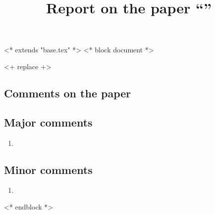 <* extends "base.tex" *>
<* block document *>
\pagestyle{fancy}
\rhead{\today}
\cfoot{\thepage}


\title{Report on the paper ``\papername''}
\author{\journalname}
\maketitle
<+ replace +>
\subsection*{Comments on the paper}
\subsection*{Major comments}
\begin{enumerate}
    \item <+ replace +>
\end{enumerate}
\subsection*{Minor comments}
\begin{enumerate}[resume]
    \item <+ replace +>
\end{enumerate}

<* endblock *>
